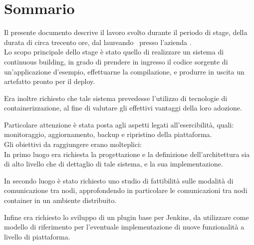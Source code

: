 
\cleardoublepage
{}
{}
\begingroup
\let\clearpage\relax
\let\cleardoublepage\relax
\let\cleardoublepage\relax

\chapter*{Sommario}

Il presente documento descrive il lavoro svolto durante il periodo di stage, della durata di circa trecento ore, dal laureando \myName\ presso l'azienda \myCompany.\\

Lo scopo principale dello stage è stato quello di realizzare un sistema di continuous building, in grado di prendere in ingresso il codice sorgente di un'applicazione d'esempio, effettuarne la compilazione, e produrre in uscita un artefatto pronto per il deploy.

Era inoltre richiesto che tale sistema prevedesse l'utilizzo di tecnologie di containerizzazione, al fine di valutare gli effettivi vantaggi della loro adozione.

Particolare attenzione è stata posta agli aspetti legati all'esercibilità, quali: monitoraggio, aggiornamento, backup e ripristino della piattaforma.\\

Gli obiettivi da raggiungere erano molteplici:\\
In primo luogo era richiesta la progettazione e la definizione dell'architettura sia di alto livello che di dettaglio di tale sistema, e la sua implementazione.

In secondo luogo è stato richiesto uno studio di fattibilità sulle modalità di comunicazione tra nodi, approfondendo in particolare le comunicazioni tra nodi container in un ambiente distribuito.

Infine era richiesto lo sviluppo di un plugin base per Jenkins, da utilizzare come modello di riferimento per l'eventuale implementazione di nuove funzionalità a livello di piattaforma.

%
%

\endgroup			

\vfill

